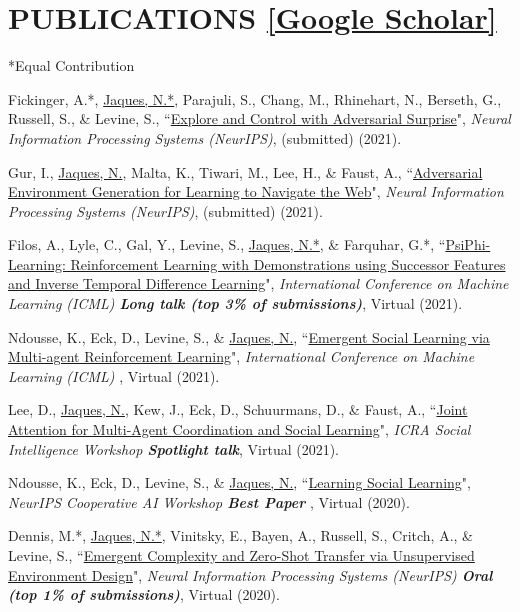 \documentclass[paper=letter,fontsize=11pt]{scrartcl} %
\newcommand{\NewPart}[2]{\section*{\uppercase{#1} #2}}
\newcommand{\PaperEntry}[6]{
		\noindent #1, ``\href{#6}{#2}", \textit{#3}, #4 (#5).}
\begin{document}
\NewPart{Publications}{\href{https://scholar.google.co.uk/citations?user=8iCb2TwAAAAJ&hl=en}{[Google Scholar]}}
*Equal Contribution
\begin{etaremune}

\item \PaperEntry{Fickinger, A.*, \underline{Jaques, N.*}, Parajuli, S., Chang, M., Rhinehart, N., Berseth, G., Russell, S., \& Levine, S.}{Explore and Control with Adversarial Surprise}{Neural Information Processing Systems (NeurIPS)}{(submitted)}{2021}{}

\item \PaperEntry{Gur, I., \underline{Jaques, N.}, Malta, K., Tiwari, M., Lee, H., \& Faust, A.}{Adversarial Environment Generation for Learning to Navigate the Web}{Neural Information Processing Systems (NeurIPS)}{(submitted)}{2021}{https://arxiv.org/abs/2103.01991}

\item \PaperEntry{Filos, A., Lyle, C., Gal, Y., Levine, S., \underline{Jaques, N.*}, \& Farquhar, G.*}{PsiPhi-Learning: Reinforcement Learning with Demonstrations using Successor Features and Inverse Temporal Difference Learning}{International Conference on Machine Learning (ICML) \textbf{Long talk (top 3\% of submissions)}}{Virtual}{2021}{https://arxiv.org/pdf/2102.12560.pdf}

\item \PaperEntry{Ndousse, K., Eck, D., Levine, S., \& \underline{Jaques, N.}}{Emergent Social Learning via Multi-agent Reinforcement Learning}{International Conference on Machine Learning (ICML) }{Virtual}{2021}{https://arxiv.org/abs/2010.00581}

\item \PaperEntry{Lee, D., \underline{Jaques, N.}, Kew, J., Eck, D., Schuurmans, D., \& Faust, A.}{Joint Attention for Multi-Agent Coordination and Social Learning}{ICRA Social Intelligence Workshop \textbf{Spotlight talk}}{Virtual}{2021}{https://arxiv.org/abs/2104.07750}

\item \PaperEntry{Ndousse, K., Eck, D., Levine, S., \& \underline{Jaques, N.}}{Learning Social Learning}{NeurIPS Cooperative AI Workshop \textbf{Best Paper} }{Virtual}{2020}{https://arxiv.org/abs/2010.00581}

\item \PaperEntry{Dennis, M.*, \underline{Jaques, N.*}, Vinitsky, E., Bayen, A., Russell, S., Critch, A., \& Levine, S.}{Emergent Complexity and Zero-Shot Transfer via Unsupervised Environment Design}{Neural Information Processing Systems (NeurIPS) \textbf{Oral (top 1\% of submissions)}}{Virtual}{2020}{https://arxiv.org/abs/2012.02096}


\end{etaremune}
\end{document}
